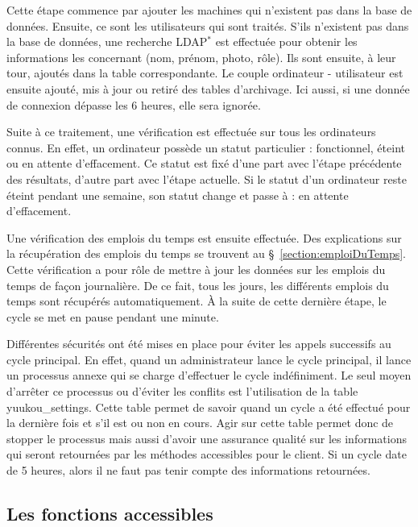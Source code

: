Cette \'etape commence par ajouter les machines qui n'existent pas dans la base de donn\'ees.
Ensuite, ce sont les utilisateurs qui sont trait\'es.
S'ils n'existent pas dans la base de donn\'ees, une recherche LDAP$^*$ est effectu\'ee pour obtenir les informations les concernant (nom, pr\'enom, photo, r\^ole).
Ils sont ensuite, \`a leur tour, ajout\'es dans la table correspondante.
Le couple ordinateur - utilisateur est ensuite ajout\'e, mis \`a jour ou retir\'e des tables d'archivage.
Ici aussi, si une donn\'ee de connexion d\'epasse les 6 heures, elle sera ignor\'ee.

Suite \`a ce traitement, une v\'erification est effectu\'ee sur tous les ordinateurs connus.
En effet, un ordinateur poss\`ede un statut particulier : fonctionnel, \'eteint ou en attente d'effacement.
Ce statut est fix\'e d'une part avec l'\'etape pr\'ec\'edente des r\'esultats, d'autre part avec l'\'etape actuelle.
Si le statut d'un ordinateur reste \'eteint pendant une semaine, son statut change et passe \`a : en attente d'effacement.

Une v\'erification des emplois du temps est ensuite effectu\'ee.
Des explications sur la r\'ecup\'eration des emplois du temps se trouvent au \S~\ref{section:emploiDuTemps}.
Cette v\'erification a pour r\^ole de mettre \`a jour les donn\'ees sur les emplois du temps de fa\c{c}on journali\`ere.
De ce fait, tous les jours, les diff\'erents emplois du temps sont r\'ecup\'er\'es automatiquement.
\`A la suite de cette derni\`ere \'etape, le cycle se met en pause pendant une minute.

Diff\'erentes s\'ecurit\'es ont \'et\'e mises en place pour \'eviter les appels successifs au cycle principal.
En effet, quand un administrateur lance le cycle principal, il lance un processus annexe qui se charge d'effectuer le cycle ind\'efiniment.
Le seul moyen d'arr\^eter ce processus ou d'\'eviter les conflits est l'utilisation de la table \textsf{yuukou\_settings}.
Cette table permet de savoir quand un cycle a \'et\'e effectu\'e pour la derni\`ere fois et s'il est ou non en cours.
Agir sur cette table permet donc de stopper le processus mais aussi d'avoir une assurance qualit\'e sur les informations qui seront retourn\'ees par les m\'ethodes accessibles pour le client.
Si un cycle date de 5 heures, alors il ne faut pas tenir compte des informations retourn\'ees.


\subsection{Les fonctions accessibles}

